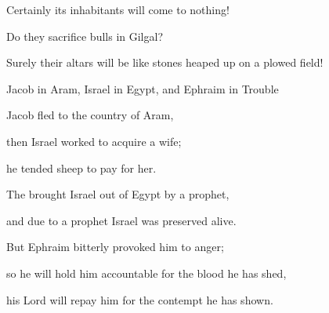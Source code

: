 {\par }{\Q Certainly
its inhabitants will come to nothing!

\par }{\Q Do they sacrifice
bulls
in Gilgal?
\par }{\Q Surely
their altars
will be like stones heaped
up on
a plowed
field!
\par }{\SH Jacob in Aram, Israel in Egypt, and Ephraim in Trouble
\par }{\Q {}Jacob
fled
to the country
of Aram,
\par }{\Q then Israel
worked
to acquire
a wife;
\par }{\Q he tended
sheep to pay for her.
\par }{\Q {}The
{}
brought
Israel
out of Egypt
by a prophet,
\par }{\Q and due to a prophet
Israel was preserved alive.
\par }{\Q {}But Ephraim
bitterly
provoked
him to anger;
\par }{\Q so he will hold him accountable for the blood
he has
shed,

\par }{\Q his Lord
will repay
him for the contempt
he has shown.

\par }
